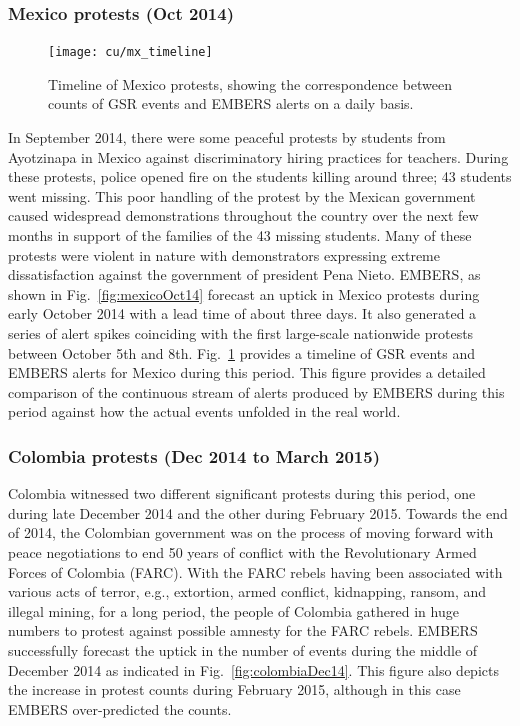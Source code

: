 \subsubsection*{Mexico protests (Oct 2014)}
\label{sec:mexico}
\begin{figure}
\centering
\texttt{[image: cu/mx\_timeline]}
\caption{Timeline of Mexico protests, showing the correspondence
between counts of GSR events and EMBERS alerts on a daily basis.}
\label{fig:mexicoTimeline}
\end{figure}

In September 2014, there were some peaceful protests by students from Ayotzinapa
in Mexico against discriminatory hiring practices for teachers. During
these protests,
police opened fire on the students killing around three; 43 students
went missing. This poor
handling of the protest by the Mexican government caused widespread demonstrations throughout
the country over the next few months in support of the families of the 
43 missing students.
Many of these protests were violent in nature with demonstrators expressing extreme
dissatisfaction against the government of president Pena Nieto. EMBERS, as
shown in Fig.~\ref{fig:mexicoOct14}
forecast an uptick in Mexico protests during early October 2014 with a lead time of about three days.
It also generated  a series of alert spikes coinciding with the first
large-scale nationwide protests between October 5th and 8th.
Fig.~\ref{fig:mexicoTimeline} provides a timeline of GSR events and
EMBERS alerts for Mexico during this period. This figure provides a detailed
comparison of the continuous stream of alerts produced by EMBERS during this period against how
the actual events unfolded in the real world.


\subsubsection*{Colombia protests (Dec 2014 to March 2015)}
Colombia witnessed two different significant protests during this period, one during late December 2014
and the other during February 2015. Towards the end of 2014, the Colombian government was on the process
of moving forward with peace negotiations to end 50 years of conflict with the Revolutionary Armed Forces
of Colombia (FARC). With the FARC rebels having been associated with various acts of terror, e.g., extortion, armed conflict,
kidnapping, ransom, and illegal mining, for a long period, the people of Colombia gathered in huge numbers
 to protest against possible amnesty for the FARC rebels.
EMBERS successfully forecast the uptick in the number of events during the
middle of December 2014 as indicated in Fig.~\ref{fig:colombiaDec14}. 
This figure also depicts the increase in protest counts
during February 2015, although in this case EMBERS over-predicted the counts. 

